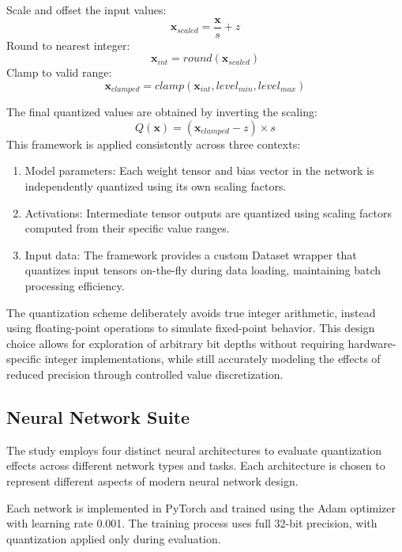 \documentclass[twocolumn]{article}
\begin{document}
Scale and offset the input values:
\begin{equation*}
\mathbf{x}_{scaled} = \frac{\mathbf{x}}{s} + z
\end{equation*}
Round to nearest integer:
\begin{equation*}
\mathbf{x}_{int} = round(\mathbf{x}_{scaled})
\end{equation*}
Clamp to valid range:
\begin{equation*}
\mathbf{x}_{clamped} = clamp(\mathbf{x}_{int}, level_{min}, level_{max})
\end{equation*}

The final quantized values are obtained by inverting the scaling:
\begin{equation*}
Q(\mathbf{x}) = ({\mathbf{x}_{clamped}} - z) \times s
\end{equation*}
This framework is applied consistently across three contexts:
\begin{enumerate}
    \item Model parameters: Each weight tensor and bias vector in the network is
    independently quantized using its own scaling factors.
    \item Activations: Intermediate tensor outputs are quantized using scaling
    factors computed from their specific value ranges.
    \item Input data: The framework provides a custom Dataset wrapper that
    quantizes input tensors on-the-fly during data loading, maintaining batch
    processing efficiency.
\end{enumerate}
The quantization scheme deliberately avoids true integer arithmetic, instead
using floating-point operations to simulate fixed-point behavior. This design
choice allows for exploration of arbitrary bit depths without requiring
hardware-specific integer implementations, while still accurately modeling the
effects of reduced precision through controlled value discretization.

\subsection{Neural Network Suite}
The study employs four distinct neural architectures to evaluate quantization
effects across different network types and tasks. Each architecture is chosen to
represent different aspects of modern neural network design.

Each network is implemented in PyTorch and trained using the Adam optimizer with
learning rate 0.001. The training process uses full 32-bit precision, with
quantization applied only during evaluation.
\end{document}
